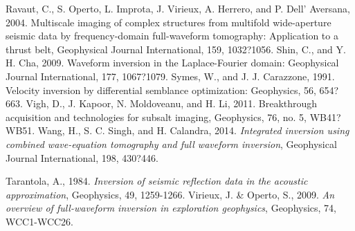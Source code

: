 \documentclass[mreferee]{gji}
\begin{document}
\begin{thebibliography}{}
 Ravaut, C., S. Operto, L. Improta, J. Virieux, A. Herrero, and P. Dell' Aversana, 2004. Multiscale imaging of complex structures from multifold wide-aperture seismic data by frequency-domain full-waveform tomography: Application to a thrust belt, Geophysical Journal International, 159, 1032?1056.
 Shin, C., and Y. H. Cha, 2009. Waveform inversion in the Laplace-Fourier domain: Geophysical Journal International, 177, 1067?1079.
 Symes, W., and J. J. Carazzone, 1991. Velocity inversion by differential semblance optimization: Geophysics, 56, 654?663.
 Vigh, D., J. Kapoor, N. Moldoveanu, and H. Li, 2011. Breakthrough acquisition and technologies for subsalt imaging, Geophysics, 76, no. 5, WB41?WB51.
 Wang, H., S. C. Singh, and H. Calandra, 2014. \textit{Integrated inversion using combined wave-equation tomography and full waveform inversion}, Geophysical Journal International, 198, 430?446.


  

   Tarantola, A., 1984. \textit{Inversion of seismic reflection data in the acoustic approximation}, Geophysics, 49, 1259-1266.
    Virieux, J. \& Operto, S., 2009. \textit{An overview of full-waveform inversion in exploration geophysics}, Geophysics, 74, WCC1-WCC26.

\end{thebibliography}
\end{document}
